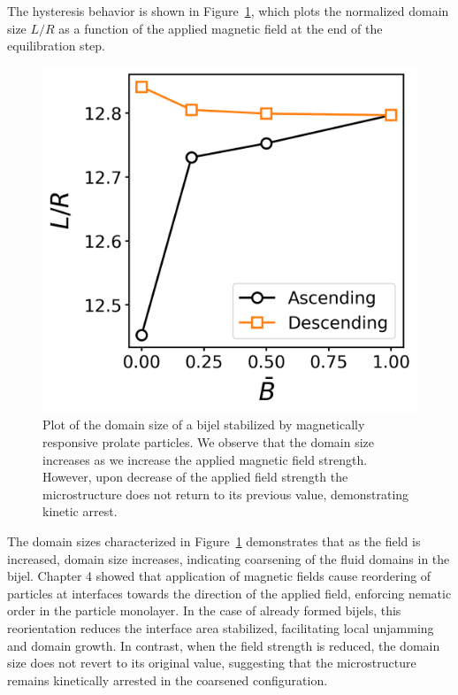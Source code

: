 The hysteresis behavior is shown in Figure~\ref{fig:hysteresis_curve}, which plots the normalized domain size \(L/R\) as a function of the applied magnetic 
field at the end of the equilibration step.

\begin{figure} 
    \centering 
    \includegraphics[scale=0.5]{../figures/results/paper2/hysteresis_curve.png} 
    \caption{Plot of the domain size of a bijel stabilized by magnetically responsive prolate particles. We observe that the domain size increases as we 
    increase the applied magnetic field strength. However, upon decrease of the applied field strength the microstructure does not return to its previous value,
    demonstrating kinetic arrest.} 
    \label{fig:hysteresis_curve} 
\end{figure}

The domain sizes characterized in Figure~\ref{fig:hysteresis_curve} demonstrates that as the field is increased, domain size increases, indicating coarsening 
of the fluid domains in the bijel. Chapter 4 showed that application of magnetic fields cause reordering of particles at interfaces towards the
direction of the applied field, enforcing nematic order in the particle monolayer. In the case of already formed bijels,
this reorientation reduces the interface area stabilized, facilitating local unjamming and domain growth. In contrast, when the field strength is reduced, 
the domain size does not revert to its original value, suggesting that the microstructure remains kinetically arrested in the coarsened configuration.

